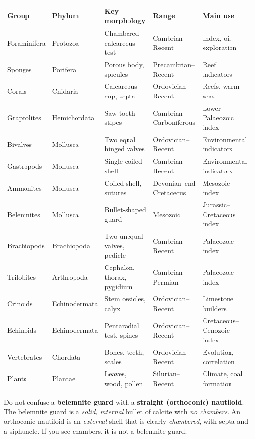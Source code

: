 \documentclass[11pt]{article}
\begin{document}
\begin{center}
\small
\begin{tabularx}{\linewidth}{|l|l|X|l|l|}
\hline
\rowcolor{popblueL} \textbf{Group} & \textbf{Phylum} & \textbf{Key morphology} & \textbf{Range} & \textbf{Main use} \\
\hline
Foraminifera & Protozoa & Chambered calcareous test & Cambrian--Recent & Index, oil exploration \\
\hline
Sponges & Porifera & Porous body, spicules & Precambrian--Recent & Reef indicators \\
\hline
Corals & Cnidaria & Calcareous cup, septa & Ordovician--Recent & Reefs, warm seas \\
\hline
Graptolites & Hemichordata & Saw-tooth stipes & Cambrian--Carboniferous & Lower Palaeozoic index \\
\hline
Bivalves & Mollusca & Two equal hinged valves & Ordovician--Recent & Environmental indicators \\
\hline
Gastropods & Mollusca & Single coiled shell & Cambrian--Recent & Environmental indicators \\
\hline
Ammonites & Mollusca & Coiled shell, sutures & Devonian--end Cretaceous & Mesozoic index \\
\hline
Belemnites & Mollusca & Bullet-shaped guard & Mesozoic & Jurassic--Cretaceous index \\
\hline
Brachiopods & Brachiopoda & Two unequal valves, pedicle & Cambrian--Recent & Palaeozoic index \\
\hline
Trilobites & Arthropoda & Cephalon, thorax, pygidium & Cambrian--Permian & Palaeozoic index \\
\hline
Crinoids & Echinodermata & Stem ossicles, calyx & Ordovician--Recent & Limestone builders \\
\hline
Echinoids & Echinodermata & Pentaradial test, spines & Ordovician--Recent & Cretaceous--Cenozoic index \\
\hline
Vertebrates & Chordata & Bones, teeth, scales & Ordovician--Recent & Evolution, correlation \\
\hline
Plants & Plantae & Leaves, wood, pollen & Silurian--Recent & Climate, coal formation \\
\hline
\end{tabularx}
\end{center}

\begin{attention}
Do not confuse a \textbf{belemnite guard} with a \textbf{straight (orthoconic) nautiloid}. The belemnite guard is a \emph{solid, internal} bullet of calcite with \emph{no chambers}. An orthoconic nautiloid is an \emph{external} shell that is clearly \emph{chambered}, with septa and a siphuncle. If you see chambers, it is not a belemnite guard.
\end{attention}
\end{document}
